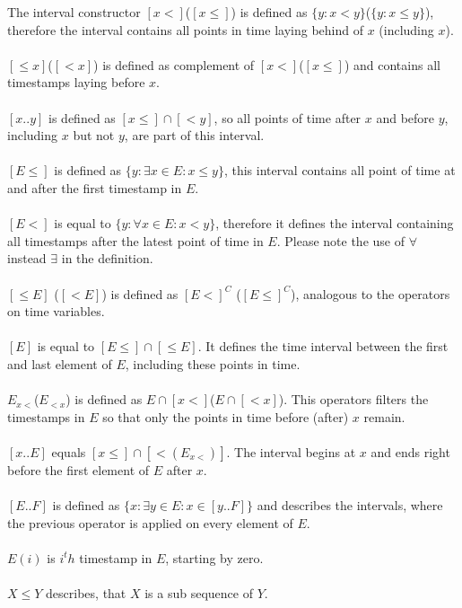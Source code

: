 	The interval constructor $[x<]$($[x\leq]$) is defined as $\{y: x < y\}$($\{y: x \leq y\}$), therefore the interval contains all points in time laying behind of $x$ (including $x$).\\ \\
	$[\leq x]$($[< x]$) is defined as complement of $[x<]$($[x\leq]$) and contains all timestamps laying before $x$.\\ \\
	$[x..y]$ is defined as $[x\leq]\cap[<y]$, so all points of time after $x$ and before $y$, including $x$ but not $y$, are part of this interval.\\ \\
	$[E \leq]$ is defined as $\{y : \exists x \in E : x \leq y\}$, this interval contains all point of time at and after the first timestamp in $E$.\\ \\
	$[E<]$ is equal to $\{y : \forall x \in E : x < y\}$, therefore it defines the interval containing all timestamps after the latest point of time in $E$. Please note the use of $\forall$ instead $\exists$ in the definition.\\ \\
	$[\leq E]$ ($[< E]$) is defined as $[E<]^C$ ($[E\leq]^C$), analogous to the operators on time variables.\\ \\
	$[E]$ is equal to $[E\leq]\cap[\leq E]$. It defines the time interval between the first and last element of $E$, including these points in time.\\ \\
	$E_{x<}$($E_{<x}$) is defined as $E\cap [x<]$($E\cap [<x]$). This operators filters the timestamps in $E$ so that only the points in time before (after) $x$ remain.\\ \\
	$[x..E]$ equals $[x\leq]\cap[<(E_{x<})]$. The interval begins at $x$ and ends right before the first element of $E$ after $x$.\\ \\
	$[E..F]$ is defined as $\{x:\exists y\in E:x\in[y..F]\}$ and describes the intervals, where the previous operator is applied on every element of $E$.\\ \\
	$E(i)$ is $i^th$ timestamp in $E$, starting by zero.\\ \\
	$X\leq Y$ describes, that $X$ is a sub sequence of $Y$.
	

